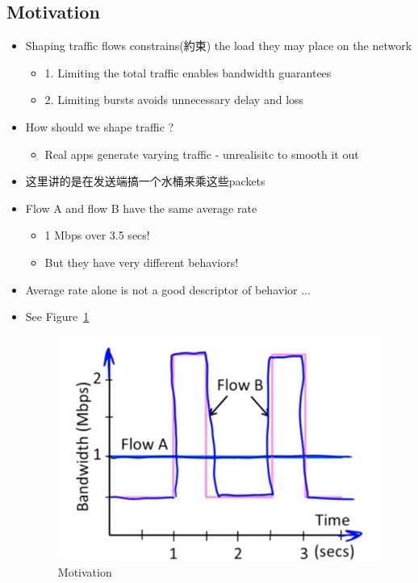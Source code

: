 \documentclass[12pt]{ctexart}   %
\begin{document}
	\subsection{Motivation}
	\begin{itemize}
		\item Shaping traffic flows constrains(約束) the load they may place on the network
		\begin{itemize}
			\item {\color{blue} 1.} Limiting the total traffic enables bandwidth guarantees
			\item {\color{blue} 2.} Limiting bursts avoids unnecessary delay and loss
		\end{itemize}
		
		\item How should we shape traffic ?
		\begin{itemize}
			\item Real apps generate varying traffic - unrealisitc to smooth it out
		\end{itemize}
		
		\item 这里讲的是在发送端搞一个水桶来乘这些packets
		
		\item Flow A and flow B have the same average rate
		\begin{itemize}
			\item 1 Mbps over 3.5 secs!
			\item But they have very different behaviors!
		\end{itemize}
		
		\item Average rate alone is not a good descriptor of behavior ...
		\item See Figure~\ref{fig:9-5-2}
		  
		 \begin{figure}[h!] %
		\centering
		 \includegraphics[scale=0.7]{images/9-5-2}
		\caption{ Motivation }
		 \label{fig:9-5-2}
		 \end{figure}
		 

\end{itemize}
\end{document}
